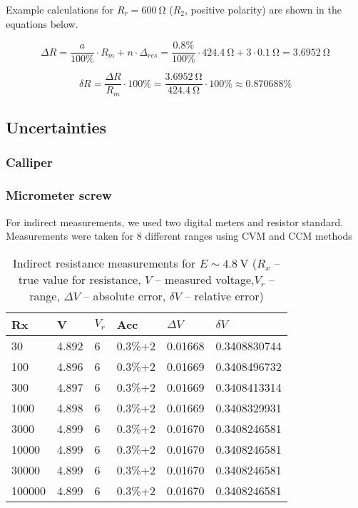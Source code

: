 Example calculations for $R_r = \SI{600}{\ohm}$ ($R_2$, positive polarity) are shown in the equations below.

\begin{equation}
	\Delta R = \frac{a}{100\unit{\percent}}\cdot R_m + n\cdot \Delta_{res} = \frac{0.8\unit{\percent}}{100\unit{\percent}}\cdot\SI{424.4}{\ohm} + 3\cdot\SI{0.1}{\ohm} = \SI{3.6952}{\ohm}
\end{equation}

\begin{equation}
	\delta R = \frac{\Delta R}{R_m}\cdot 100\unit{\percent} = \frac{\SI{3.6952}{\ohm}}{\SI{424.4}{\ohm}}\cdot 100\unit{\percent}\approx 0.870688\unit{\percent}
\end{equation}

\subsection{Uncertainties}


\subsubsection{Calliper}


\subsubsection{Micrometer screw}

For indirect measurements, we used two digital meters and resistor standard. Measurements were taken for 8 different ranges using CVM and CCM methods 

\begin{table}[!ht]
	\centering
	\begin{tabular}{|l|l|l|l|l|l|}
		\hline
		Rx & V & $V_r$ & Acc & $\Delta V$ & $\delta V$ \\ \hline
		30 & 4.892 & 6 & 0.3\%+2 & 0.01668 & 0.3408830744 \\ \hline
		100 & 4.896 & 6 & 0.3\%+2 & 0.01669 & 0.3408496732 \\ \hline
		300 & 4.897 & 6 & 0.3\%+2 & 0.01669 & 0.3408413314 \\ \hline
		1000 & 4.898 & 6 & 0.3\%+2 & 0.01669 & 0.3408329931 \\ \hline
		3000 & 4.899 & 6 & 0.3\%+2 & 0.01670 & 0.3408246581 \\ \hline
		10000 & 4.899 & 6 & 0.3\%+2 & 0.01670 & 0.3408246581 \\ \hline
		30000 & 4.899 & 6 & 0.3\%+2 & 0.01670 & 0.3408246581 \\ \hline
		100000 & 4.899 & 6 & 0.3\%+2 & 0.01670 & 0.3408246581 \\ \hline
	\end{tabular}
	\caption{Indirect resistance measurements for $E \sim \SI{4.8}{\volt}$ ($R_x$ -- true value for resistance, $V$ -- measured voltage,$V_r$ -- range,  $\Delta V$ -- absolute error, $\delta V$ -- relative error)}
	\label{tab:analog_volt_1}
\end{table}

